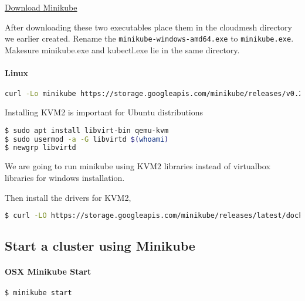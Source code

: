 \href{https://storage.googleapis.com/minikube/releases/v0.25.0/minikube-windows-amd64.exe}{Download
Minikube}

After downloading these two executables place them in the cloudmesh
directory we earlier created. Rename the \verb|minikube-windows-amd64.exe|
to \verb|minikube.exe|. Makesure minikube.exe and kubectl.exe lie in the
same directory.

\paragraph{Linux}\label{linux}

\begin{lstlisting}[language=bash]
curl -Lo minikube https://storage.googleapis.com/minikube/releases/v0.25.0/minikube-linux-amd64 && chmod +x minikube && sudo mv minikube /usr/local/bin/
\end{lstlisting}

Installing KVM2 is important for Ubuntu distributions

\begin{lstlisting}[language=bash]
$ sudo apt install libvirt-bin qemu-kvm
$ sudo usermod -a -G libvirtd $(whoami)
$ newgrp libvirtd
\end{lstlisting}

We are going to run minikube using KVM2 libraries instead of virtualbox
libraries for windows installation.

Then install the drivers for KVM2,

\begin{lstlisting}[language=bash]
$ curl -LO https://storage.googleapis.com/minikube/releases/latest/docker-machine-driver-kvm2 && chmod +x docker-machine-driver-kvm2 && sudo mv docker-machine-driver-kvm2 /usr/bin/
\end{lstlisting}

\subsection{Start a cluster using
Minikube}\label{start-a-cluster-using-minikube}

\paragraph{OSX Minikube Start}\label{osx-minikube-start}

\begin{lstlisting}[language=bash]
$ minikube start
\end{lstlisting}

